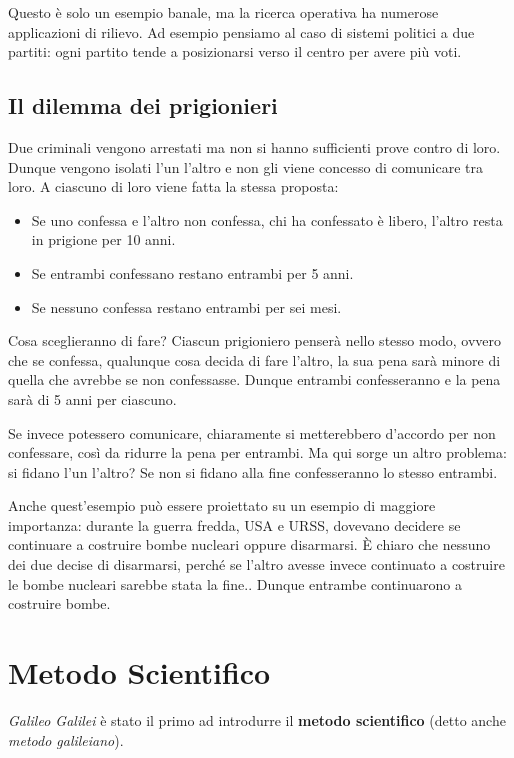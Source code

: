 \documentclass[11pt]{book}
\begin{document}

Questo \`e solo un esempio banale, ma la ricerca operativa ha numerose
applicazioni di rilievo. Ad esempio pensiamo al caso di sistemi
politici a due partiti: ogni partito tende a posizionarsi verso il
centro per avere pi\`u voti.

\subsection{Il dilemma dei prigionieri}
Due criminali vengono arrestati ma non si hanno sufficienti prove
contro di loro. Dunque vengono isolati l'un l'altro e non gli viene
concesso di comunicare tra loro. A ciascuno di loro viene fatta la
stessa proposta: 
\begin{itemize}
\item Se uno confessa e l'altro non confessa, chi ha confessato \`e
  libero, l'altro resta in prigione per 10 anni.
\item Se entrambi confessano restano entrambi per 5 anni.
\item Se nessuno confessa restano entrambi per sei mesi.
\end{itemize}

Cosa sceglieranno di fare?  Ciascun prigioniero penser\`a nello stesso
modo, ovvero che se confessa, qualunque cosa decida di fare l'altro,
la sua pena sar\`a minore di quella che avrebbe se non
confessasse. Dunque entrambi confesseranno e la pena sar\`a di 5 anni
per ciascuno. 


Se invece potessero comunicare, chiaramente si metterebbero d'accordo
per non confessare, cos\`i da ridurre la pena per entrambi. Ma qui
sorge un altro problema: si fidano l'un l'altro? Se non si fidano alla
fine confesseranno lo stesso entrambi.

Anche quest'esempio pu\`o essere proiettato su un esempio di maggiore
importanza: durante la guerra fredda, USA e URSS, dovevano decidere se
continuare a costruire bombe nucleari oppure disarmarsi. \`E chiaro che
nessuno dei due decise di disarmarsi, perch\'e se l'altro avesse invece
continuato a costruire le bombe nucleari sarebbe stata la
fine.. Dunque entrambe continuarono a costruire bombe.

\section{Metodo Scientifico}

{\em Galileo Galilei} \`e stato il primo ad introdurre il {\bf metodo
  scientifico} (detto anche {\em metodo galileiano}). 
\end{document}
